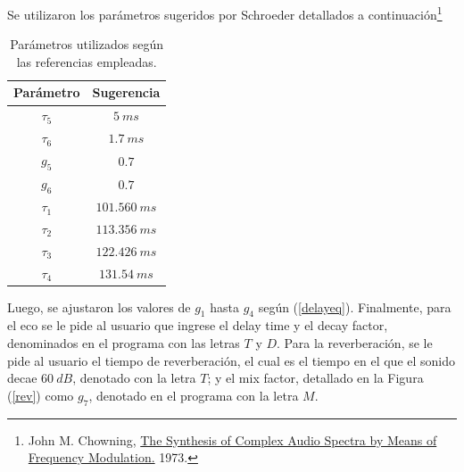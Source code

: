 Se utilizaron los parámetros sugeridos por Schroeder detallados a continuación\footnote{John M. Chowning, \href{https://ccrma.stanford.edu/sites/default/files/user/jc/fm_synthesispaper-2.pdf}{The Synthesis of Complex Audio Spectra by Means of Frequency Modulation.} 1973.}

\begin{table}[H]
\centering
\begin{tabular}{@{}cc@{}}
\toprule
Parámetro & Sugerencia \\ \midrule
$\tau_5$ & $5 \ ms$ \\
$\tau_6$ & $1.7 \ ms$ \\
$g_5$ & $0.7$ \\
$g_6$ & $0.7$ \\
$\tau_1$ & $101.560 \ ms$ \\
$\tau_2$ & $113.356 \ ms$ \\
$\tau_3$ & $122.426 \ ms$ \\
$\tau_4$ & $131.54 \ ms$ \\ \bottomrule
\end{tabular}
\caption{Parámetros utilizados según las referencias empleadas.}
\end{table}

Luego, se ajustaron los valores de $g_1$ hasta $g_4$ según (\ref{delayeq}). Finalmente, para el eco se le pide al usuario que ingrese el delay time y el decay factor, denominados en el programa con las letras $T$ y $D$. Para la reverberación, se le pide al usuario el tiempo de reverberación, el cual es el tiempo en el que el sonido decae $60 \ dB$, denotado con la letra $T$; y el mix factor, detallado en la Figura (\ref{rev}) como $g_7$, denotado en el programa con la letra $M$.